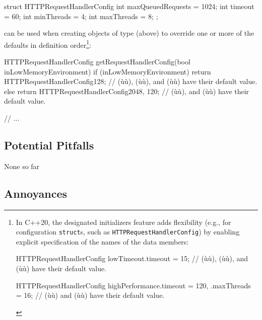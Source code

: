 \begin{emcppslisting}[language=C++]
struct HTTPRequestHandlerConfig
{
    int maxQueuedRequests = 1024;
    int timeout           = 60;
    int minThreads        = 4;
    int maxThreads        = 8;
};
\end{emcppslisting}

\noindent {} can be used when creating objects of
type  (above) to override one or more
of the defaults in definition order{\cprotect\footnote{In C++20, the
designated initializers feature adds flexibility (e.g., for
configuration \lstinline!struct!s, such as
\lstinline!HTTPRequestHandlerConfig!) by enabling explicit specification
of the names of the data members:

\begin{emcppslisting}[language=C++, basicstyle={\ttfamily\footnotesize}]
HTTPRequestHandlerConfig lowTimeout{.timeout = 15};
    // (ù{}ù), (ù{}ù), and (ù{}ù) have their default value.

HTTPRequestHandlerConfig highPerformance{.timeout = 120, .maxThreads = 16};
    // (ù{}ù) and (ù{}ù) have their default value.
\end{emcppslisting}
      }}:

\begin{emcppslisting}[language=C++]
HTTPRequestHandlerConfig getRequestHandlerConfig(bool inLowMemoryEnvironment)
{
    if (inLowMemoryEnvironment)
    {
        return HTTPRequestHandlerConfig{128};
            // (ù{}ù), (ù{}ù), and (ù{}ù) have their default value.
    }
    else
    {
        return HTTPRequestHandlerConfig{2048, 120};
            // (ù{}ù), and (ù{}ù) have their default value.
    }
}

// ...
\end{emcppslisting}


\subsection[Potential Pitfalls]{Potential Pitfalls}\label{potential-pitfalls}

None so far

\subsection[Annoyances]{Annoyances}\label{annoyances}

